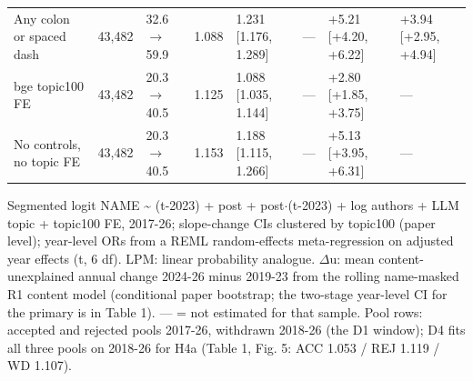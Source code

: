 \begin{table}[t]
\begin{tabular}{l r l l l l l l}
Any colon or spaced dash & 43,482 & 32.6 $\rightarrow$ 59.9 & 1.088 & 1.231 [1.176, 1.289] & --- & +5.21 [+4.20, +6.22] & +3.94 [+2.95, +4.94] \\
bge topic100 FE & 43,482 & 20.3 $\rightarrow$ 40.5 & 1.125 & 1.088 [1.035, 1.144] & --- & +2.80 [+1.85, +3.75] & --- \\
No controls, no topic FE & 43,482 & 20.3 $\rightarrow$ 40.5 & 1.153 & 1.188 [1.115, 1.266] & --- & +5.13 [+3.95, +6.31] & --- \\
\bottomrule
\end{tabular}
\par\smallskip
\parbox{\linewidth}{\scriptsize Segmented logit NAME \textasciitilde{} (t-2023) + post + post$\cdot$(t-2023) + log authors + LLM topic + topic100 FE, 2017-26; slope-change CIs clustered by topic100 (paper level); year-level ORs from a REML random-effects meta-regression on adjusted year effects (t, 6 df). LPM: linear probability analogue. $\Delta$u: mean content-unexplained annual change 2024-26 minus 2019-23 from the rolling name-masked R1 content model (conditional paper bootstrap; the two-stage year-level CI for the primary is in Table 1). --- = not estimated for that sample. Pool rows: accepted and rejected pools 2017-26, withdrawn 2018-26 (the D1 window); D4 fits all three pools on 2018-26 for H4a (Table 1, Fig. 5: ACC 1.053 / REJ 1.119 / WD 1.107).}
\end{table}
